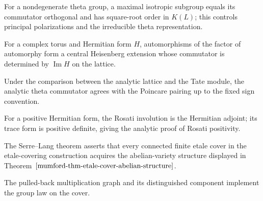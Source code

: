 \begin{theorem}
\label{mumford-iv23-maximal-isotropic-theorem}
For a nondegenerate theta group, a maximal isotropic subgroup equals its
commutator orthogonal and has square-root order in $K(L)$; this controls
principal polarizations and the irreducible theta representation.
\notready
\end{theorem}

\begin{definition}
\label{mumford-iv24-analytic-theta-extension}
For a complex torus and Hermitian form $H$, automorphisms of the factor of
automorphy form a central Heisenberg extension whose commutator is determined
by $\operatorname{Im}H$ on the lattice.
\notready
\end{definition}

\begin{theorem}
\label{mumford-iv24-analytic-ladic-comparison}
Under the comparison between the analytic lattice and the Tate module, the
analytic theta commutator agrees with the Poincare pairing up to the fixed sign
convention.
\notready
\end{theorem}

\begin{theorem}
\label{mumford-iv24-analytic-rosati}
For a positive Hermitian form, the Rosati involution is the Hermitian adjoint;
its trace form is positive definite, giving the analytic proof of Rosati
positivity.
\notready
\end{theorem}

\begin{remark}
\label{mumford-iv18-etale-covering-abelian-structure}
The Serre--Lang theorem asserts that every connected finite etale cover in the
etale-covering construction acquires the abelian-variety structure displayed
in Theorem~$\ref{mumford-thm-etale-cover-abelian-structure}$.
\notready
\end{remark}

\begin{remark}
\label{mumford-iv18-etale-graph-pullback}
The pulled-back multiplication graph and its distinguished component implement
the group law on the cover.
\notready
\end{remark}

